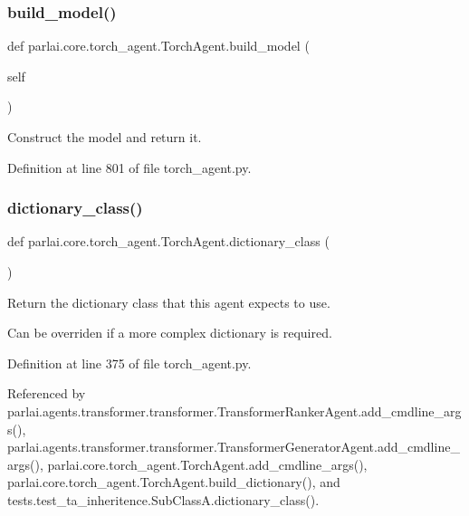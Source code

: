 \subsubsection{\texorpdfstring{build\+\_\+model()}{build\_model()}}
{\footnotesize\ttfamily def parlai.\+core.\+torch\+\_\+agent.\+Torch\+Agent.\+build\+\_\+model (\begin{DoxyParamCaption}\item[{}]{self }\end{DoxyParamCaption})}

\begin{DoxyVerb}Construct the model and return it.\end{DoxyVerb}
 

Definition at line 801 of file torch\+\_\+agent.\+py.

\mbox{\label{classparlai_1_1core_1_1torch__agent_1_1TorchAgent_aea8849fa69a3f5dbd3216c8b06f180ea}} 
\subsubsection{\texorpdfstring{dictionary\+\_\+class()}{dictionary\_class()}}
{\footnotesize\ttfamily def parlai.\+core.\+torch\+\_\+agent.\+Torch\+Agent.\+dictionary\+\_\+class (\begin{DoxyParamCaption}{ }\end{DoxyParamCaption})\hspace{0.3cm}{\ttfamily [static]}}

\begin{DoxyVerb}Return the dictionary class that this agent expects to use.

Can be overriden if a more complex dictionary is required.
\end{DoxyVerb}
 

Definition at line 375 of file torch\+\_\+agent.\+py.



Referenced by parlai.\+agents.\+transformer.\+transformer.\+Transformer\+Ranker\+Agent.\+add\+\_\+cmdline\+\_\+args(), parlai.\+agents.\+transformer.\+transformer.\+Transformer\+Generator\+Agent.\+add\+\_\+cmdline\+\_\+args(), parlai.\+core.\+torch\+\_\+agent.\+Torch\+Agent.\+add\+\_\+cmdline\+\_\+args(), parlai.\+core.\+torch\+\_\+agent.\+Torch\+Agent.\+build\+\_\+dictionary(), and tests.\+test\+\_\+ta\+\_\+inheritence.\+Sub\+Class\+A.\+dictionary\+\_\+class().

